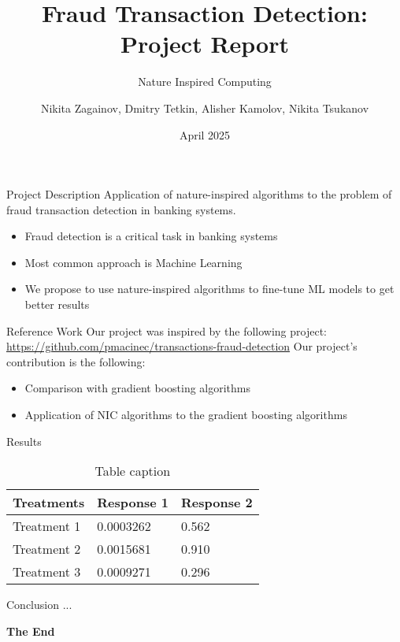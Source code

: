 \documentclass[aspectratio=169,xcolor=dvipsnames]{beamer}
\title{Fraud Transaction Detection: Project Report}
\subtitle{Nature Inspired Computing}
\author{Nikita Zagainov, Dmitry Tetkin, Alisher Kamolov, Nikita Tsukanov}
\institute
{
    Innopolis University
}
\date{April 2025} %
\begin{document}
\begin{frame}
	\titlepage
\end{frame}


\begin{frame}{Project Description}
	Application of nature-inspired algorithms
	to the problem of fraud transaction detection
	in banking systems.
	\begin{itemize}
		\item Fraud detection is a critical task in banking systems
		\item Most common approach is Machine Learning
		\item We propose to use nature-inspired algorithms to fine-tune
		      ML models to get better results
	\end{itemize}
\end{frame}


\begin{frame}{Reference Work}
	Our project was inspired by the following project:
	\url{https://github.com/pmacinec/transactions-fraud-detection}
	Our project's contribution is the following:
	\begin{itemize}
		\item Comparison with gradient boosting algorithms
		\item Application of NIC algorithms to the gradient boosting
		      algorithms
	\end{itemize}

\end{frame}

\begin{frame}{Results}
	\begin{table}
		\begin{tabular}{l l l}
			\toprule
			\textbf{Treatments} & \textbf{Response 1} & \textbf{Response 2} \\
			\midrule
			Treatment 1         & 0.0003262           & 0.562               \\
			Treatment 2         & 0.0015681           & 0.910               \\
			Treatment 3         & 0.0009271           & 0.296               \\
			\bottomrule
		\end{tabular}
		\caption{Table caption}
	\end{table}
\end{frame}


\begin{frame}{Conclusion}
	...
\end{frame}


\begin{frame}
	\Huge{\centerline{\textbf{The End}}}
\end{frame}

\end{document}
